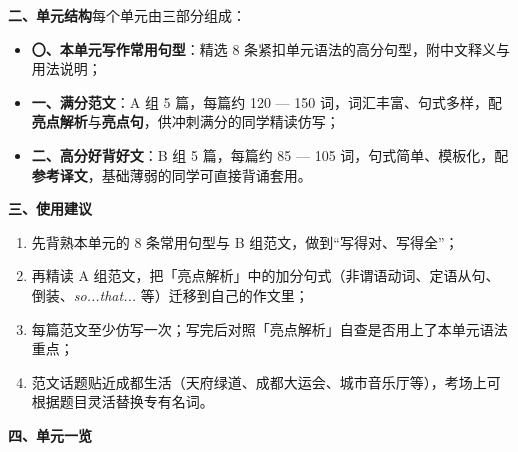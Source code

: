 \documentclass[UTF8,a4paper,11pt,oneside]{ctexbook}
\begin{document}
\vspace{0.6em}
\noindent\textbf{二、单元结构}\quad 每个单元由三部分组成：
\begin{itemize}[leftmargin=2.2em,itemsep=0.25ex,topsep=0.35ex]
  \item \textbf{〇、本单元写作常用句型}：精选 8 条紧扣单元语法的高分句型，附中文释义与用法说明；
  \item \textbf{一、满分范文}：A 组 5 篇，每篇约 120 — 150 词，词汇丰富、句式多样，配\textbf{亮点解析}与\textbf{亮点句}，供冲刺满分的同学精读仿写；
  \item \textbf{二、高分好背好文}：B 组 5 篇，每篇约 85 — 105 词，句式简单、模板化，配\textbf{参考译文}，基础薄弱的同学可直接背诵套用。
\end{itemize}

\vspace{0.6em}
\noindent\textbf{三、使用建议}
\begin{enumerate}[leftmargin=2.2em,itemsep=0.25ex,topsep=0.35ex]
  \item 先背熟本单元的 8 条常用句型与 B 组范文，做到“写得对、写得全”；
  \item 再精读 A 组范文，把「亮点解析」中的加分句式（非谓语动词、定语从句、倒装、\textit{so...that...} 等）迁移到自己的作文里；
  \item 每篇范文至少仿写一次；写完后对照「亮点解析」自查是否用上了本单元语法重点；
  \item 范文话题贴近成都生活（天府绿道、成都大运会、城市音乐厅等），考场上可根据题目灵活替换专有名词。
\end{enumerate}

\clearpage
\vspace{0.2em}
\noindent\textbf{四、单元一览}
\end{document}
